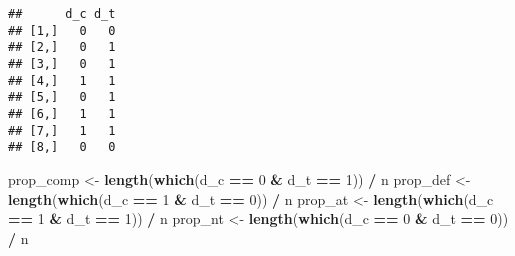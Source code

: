 \documentclass[12pt,leqno]{article}
\newenvironment{Shaded}{\begin{snugshade}}{\end{snugshade}}
\newcommand{\DecValTok}[1]{\textcolor[rgb]{0.00,0.00,0.81}{#1}}
\newcommand{\KeywordTok}[1]{\textcolor[rgb]{0.13,0.29,0.53}{\textbf{#1}}}
\newcommand{\NormalTok}[1]{#1}
\newcommand{\OperatorTok}[1]{\textcolor[rgb]{0.81,0.36,0.00}{\textbf{#1}}}
\newcommand{\StringTok}[1]{\textcolor[rgb]{0.31,0.60,0.02}{#1}}
\theoremstyle{newstyle}
\begin{document}
\begin{verbatim}
##      d_c d_t
## [1,]   0   0
## [2,]   0   1
## [3,]   0   1
## [4,]   1   1
## [5,]   0   1
## [6,]   1   1
## [7,]   1   1
## [8,]   0   0
\end{verbatim}

\begin{Shaded}
\begin{Highlighting}[]
\NormalTok{prop\_comp \textless{}{-}}\StringTok{ }\KeywordTok{length}\NormalTok{(}\KeywordTok{which}\NormalTok{(d\_c }\OperatorTok{==}\StringTok{ }\DecValTok{0} \OperatorTok{\&}\StringTok{ }\NormalTok{d\_t }\OperatorTok{==}\StringTok{ }\DecValTok{1}\NormalTok{)) }\OperatorTok{/}\StringTok{ }\NormalTok{n}
\NormalTok{prop\_def \textless{}{-}}\StringTok{ }\KeywordTok{length}\NormalTok{(}\KeywordTok{which}\NormalTok{(d\_c }\OperatorTok{==}\StringTok{ }\DecValTok{1} \OperatorTok{\&}\StringTok{ }\NormalTok{d\_t }\OperatorTok{==}\StringTok{ }\DecValTok{0}\NormalTok{)) }\OperatorTok{/}\StringTok{ }\NormalTok{n}
\NormalTok{prop\_at \textless{}{-}}\StringTok{ }\KeywordTok{length}\NormalTok{(}\KeywordTok{which}\NormalTok{(d\_c }\OperatorTok{==}\StringTok{ }\DecValTok{1} \OperatorTok{\&}\StringTok{ }\NormalTok{d\_t }\OperatorTok{==}\StringTok{ }\DecValTok{1}\NormalTok{)) }\OperatorTok{/}\StringTok{ }\NormalTok{n}
\NormalTok{prop\_nt \textless{}{-}}\StringTok{ }\KeywordTok{length}\NormalTok{(}\KeywordTok{which}\NormalTok{(d\_c }\OperatorTok{==}\StringTok{ }\DecValTok{0} \OperatorTok{\&}\StringTok{ }\NormalTok{d\_t }\OperatorTok{==}\StringTok{ }\DecValTok{0}\NormalTok{)) }\OperatorTok{/}\StringTok{ }\NormalTok{n}


\end{Highlighting}
\end{Shaded}
\end{document}
